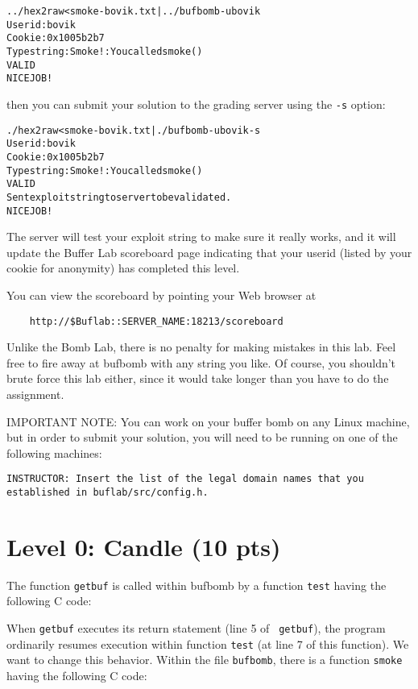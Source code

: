 \documentclass[11pt]{article}
\newenvironment{ccode}%
{\small}%
{}
\newenvironment{tty}%
{\small\begin{alltt}}%
{\end{alltt}}
\begin{document}
\begin{tty}
    ../hex2raw < smoke-bovik.txt | ../bufbomb -u bovik 
    Userid: bovik
    Cookie: 0x1005b2b7
    Type string:Smoke!: You called smoke()
    VALID
    NICE JOB!
\end{tty}
then you can submit your 
solution to the grading server using the \texttt{-s} option:
\begin{tty}
    ./hex2raw < smoke-bovik.txt | ./bufbomb -u bovik -s
    Userid: bovik
    Cookie: 0x1005b2b7
    Type string:Smoke!: You called smoke()
    VALID
    Sent exploit string to server to be validated.
    NICE JOB!
\end{tty}
The server will test your exploit string to make sure it really works,
and it will update the Buffer Lab scoreboard page indicating that your
userid (listed by your cookie for anonymity) has completed this level.

You can view the scoreboard by pointing your Web browser at 
\begin{verbatim}
    http://$Buflab::SERVER_NAME:18213/scoreboard
\end{verbatim}

Unlike the Bomb Lab, there is no penalty for making mistakes in this
lab.  Feel free to fire away at {\sc bufbomb} with any string you
like.  Of course, you shouldn't brute force this lab either, since it
would take longer than you have to do the assignment.

IMPORTANT NOTE: You can work on your buffer bomb on any Linux machine, but 
in order to submit your solution, you will need to be running on one of the 
following machines:
\begin{verbatim}
INSTRUCTOR: Insert the list of the legal domain names that you 
established in buflab/src/config.h.
\end{verbatim}

\section*{Level 0: Candle (10 pts)}

The function {\tt getbuf} is called within {\sc bufbomb} by a function
{\tt test} having the following C code:

\begin{ccode}

\end{ccode}

When {\tt getbuf} executes its return statement (line 5 of {\tt
getbuf}), the program ordinarily resumes execution within function
{\tt test} (at line 7 of this function). We want to change this behavior.
Within the file {\tt bufbomb}, there is a function {\tt smoke} having
the following C code:
\end{document}
